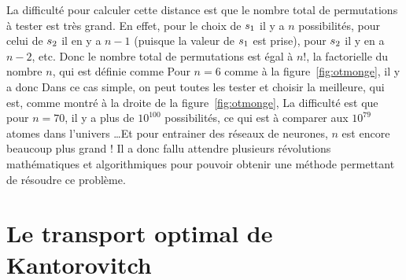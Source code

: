 La difficulté pour calculer cette distance est que le nombre total de permutations à tester est très grand. En effet, pour le choix de $s_{1}$ il y a $n$ possibilités, pour celui de $s_{2}$ il en y a $n-1$ (puisque la valeur de $s_{1}$ est prise), pour $s_{2}$ il y en a $n-2$, etc. Donc le nombre total de permutations est égal à $n!$, la factorielle du nombre $n$, qui est définie comme
Pour $n=6$ comme à la figure~\ref{fig:otmonge}, il y a donc 
Dans ce cas simple, on peut toutes les tester et choisir la meilleure, qui est, comme montré à la droite de la figure~\ref{fig:otmonge}, 
La difficulté est que pour $n=70$, il y a plus de $10^{100}$ possibilités, ce qui est à comparer aux $10^{79}$ atomes dans l'univers \ldots Et pour entrainer des réseaux de neurones, $n$ est encore beaucoup plus grand ! 
%
Il a donc fallu attendre plusieurs révolutions mathématiques et algorithmiques pour pouvoir obtenir une méthode permettant de résoudre ce problème. 


\section{Le transport optimal de Kantorovitch}
\label{sec-kanto}

